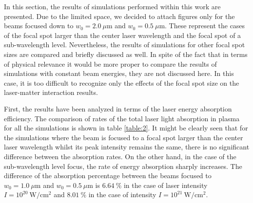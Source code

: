 In this section, the results of simulations performed within this work are presented. Due to the limited space, we decided to attach figures only for the beams focused down to $ w_0 = 2.0 \ \mu\mathrm{m} $ and $ w_0 = 0.5 \ \mu\mathrm{m} $. These represent the cases of the focal spot larger than the center laser wavelength and the focal spot of a sub-wavelength level. Nevertheless, the results of simulations for other focal spot sizes are compared and briefly discussed as well. In spite of the fact that in terms of physical relevance it would be more proper to compare the results of simulations with constant beam energies, they are not discussed here. In this case, it is too difficult to recognize only the effects of the focal spot size on the laser-matter interaction results.

First, the results have been analyzed in terms of the laser energy absorption efficiency. The comparison of rates of the total laser light absorption in plasma for all the simulations is shown in table \ref{table:2}. It might be clearly seen that for the simulations where the beam is focused to a focal spot larger than the center laser wavelength whilst its peak intensity remains the same, there is no significant difference between the absorption rates. On the other hand, in the case of the sub-wavelength level focus, the rate of energy absorption sharply increases. The difference of the absorption percentage between the beams focused to $ w_0 = 1.0 \ \mu\mathrm{m} $ and $ w_0 = 0.5 \ \mu\mathrm{m} $ is $ 6.64 \ \% $ in the case of laser intensity $ I = 10^{20} \ \mathrm{W/cm^2} $ and $ 8.01 \ \% $ in the case of intensity $ I = 10^{21} \ \mathrm{W/cm^2} $.


